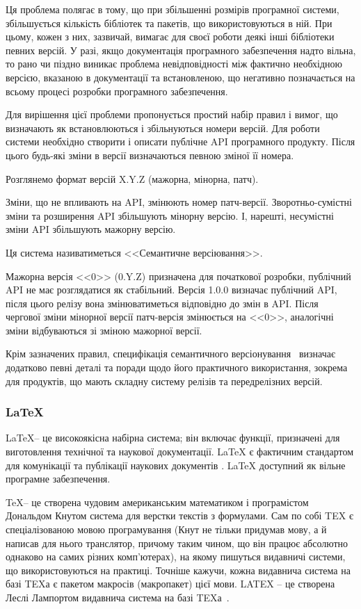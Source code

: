 Ця проблема полягає в тому, що при збільшенні розмірів програмної системи, збільшується кількість бібліотек та пакетів, що використовуються в ній. При цьому, кожен з них, зазвичай, вимагає для своєї роботи деякі інші бібліотеки певних версій. У разі, якщо документація програмного забезпечення надто вільна, то рано чи піздно виникає проблема невідповідності між фактично необхідною версією, вказаною в документації та встановленою, що негативно позначається на всьому процесі розробки програмного забезпечення.

Для вирішення цієї проблеми пропонується простий набір правил і вимог, що визначають як встановлюються і збільнуються номери версій. Для роботи системи необхідно створити і описати публічне API програмного продукту. Після цього будь-які зміни в версії визначаються певною зміної її номера.

Розглянемо формат версій X.Y.Z (мажорна, мінорна, патч).

Зміни, що не впливають на API, змінюють номер патч-версії. Зворотньо-сумістні зміни та розширення API збільшують мінорну версію. І, нарешті, несумістні зміни API збільшують мажорну версію.

Ця система називатиметься <<Семантичне версіювання>>.

Мажорна версія <<0>> (0.Y.Z) призначена для початкової розробки, публічний API не має розглядатися як стабільний. Версія 1.0.0 визначає публічний API, після цього релізу вона змінюватиметься відповідно до змін в API. Після чергової зміни мінорної версії патч-версія змінюється на <<0>>, аналогічні зміни відбуваються зі зміною мажорної версії.

Крім зазначених правил, специфікація семантичного версіонування~\cite{semver} визначає додатково певні деталі та поради щодо його практичного використання, зокрема для продуктів, що мають складну систему релізів та передрелізних версій.

\subsubsection{LaTeX} \label{subsub:latex}

\LaTeX -- це високоякісна набірна система; він включає функції, призначені для виготовлення технічної та наукової документації. LaTeX є фактичним стандартом для комунікації та публікації наукових документів \cite{lamport1994latex}. LaTeX доступний як вільне програмне забезпечення.

\TeX -- це створена чудовим американським математиком і програмістом Дональдом Кнутом система для верстки текстів з формулами. Сам по собі TEX є спеціалізованою мовою програмування (Кнут не тільки придумав мову, а й написав для нього транслятор, причому таким чином, що він працює абсолютно однаково на самих різних комп'ютерах), на якому пишуться видавничі системи, що використовуються на практиці. Точніше кажучи, кожна видавнича система на базі TEXа є пакетом макросів (макропакет) цієї мови. LATEX -- це створена Леслі Лампортом видавнича система на базі TEXа~\cite{львовский2003latex}.

